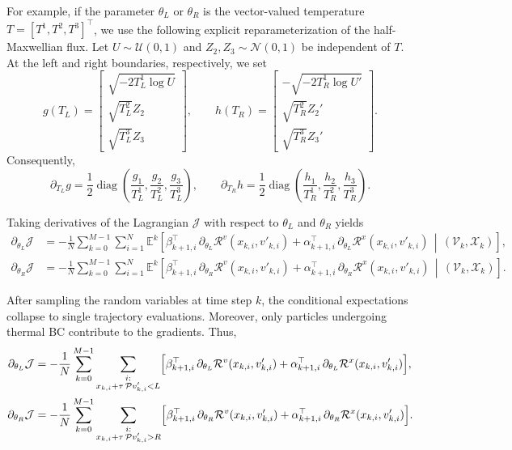 \documentclass[12pt,nopreprintline]{elsarticle}
\begin{document}
{
For example, if the parameter $\theta_L$ or $\theta_R$ is the vector-valued temperature \(T=[T^1,T^2,T^3]^\top\), we use the following explicit reparameterization of the half-Maxwellian flux. Let \(U\sim\mathcal U(0,1)\) and \(Z_2,Z_3\sim\mathcal N(0,1)\) be independent of \(T\). At the left and right boundaries, respectively, we set
\[
g(T_L)=
\begin{bmatrix}
\sqrt{-2T_L^1\log U}\\
\sqrt{T_L^2}Z_2\\
\sqrt{T_L^3}Z_3
\end{bmatrix},
\qquad
h(T_R)=
\begin{bmatrix}
-\sqrt{-2T_R^1\log U'}\\
\sqrt{T_R^2}Z_2'\\
\sqrt{T_R^3}Z_3'
\end{bmatrix}.
\]
Consequently,
\[
\partial_{T_L}g
=
\frac12\operatorname{diag}
\left(\frac{g_1}{T_L^1},\frac{g_2}{T_L^2},\frac{g_3}{T_L^3}\right),
\qquad
\partial_{T_R}h
=
\frac12\operatorname{diag}
\left(\frac{h_1}{T_R^1},\frac{h_2}{T_R^2},\frac{h_3}{T_R^3}\right).
\]

}

Taking derivatives of the Lagrangian $\mathcal J$ with respect to $\theta_L$ and $\theta_R$ yields
\begin{align}
\partial_{\theta_L} \mathcal J
&=
-\frac{1}{N} \sum_{k=0}^{M-1} \sum_{i=1}^N
\mathbb E^k \!\left[
\beta_{k+1,i}^{\top}\,\partial_{\theta_L}\mathcal R^v(x_{k,i},v'_{k,i})
+
\alpha_{k+1,i}^{\top}\,\partial_{\theta_L}\mathcal R^x(x_{k,i},v'_{k,i})
\,\middle|\, (\mathcal V_k,\mathcal X_k)
\right], \label{eq:thermal_grad_L_expect} \\
\partial_{\theta_R} \mathcal J
&=
-\frac{1}{N} \sum_{k=0}^{M-1} \sum_{i=1}^N
\mathbb E^k \!\left[
\beta_{k+1,i}^{\top}\,\partial_{\theta_R}\mathcal R^v(x_{k,i},v'_{k,i})
+
\alpha_{k+1,i}^{\top}\,\partial_{\theta_R}\mathcal R^x(x_{k,i},v'_{k,i})
\,\middle|\, (\mathcal V_k,\mathcal X_k)
\right]. \label{eq:thermal_grad_R_expect}
\end{align}

After sampling the random variables at time step $k$, the conditional expectations collapse to single trajectory evaluations. Moreover, only particles undergoing thermal BC contribute to the gradients. Thus,
\begin{align}
\partial_{\theta_L} \mathcal J
&=
-\frac{1}{N} \sum_{k=0}^{M-1}
\sum_{\substack{i:\\ x_{k,i}+\tau\,\mathcal P v'_{k,i}<L}}
\Bigl[
\beta_{k+1,i}^{\top}\,\partial_{\theta_L}\mathcal R^v(x_{k,i},v'_{k,i})
+
\alpha_{k+1,i}^{\top}\,\partial_{\theta_L}\mathcal R^x(x_{k,i},v'_{k,i})
\Bigr],
\label{eq:thermal_grad_L}\\
\partial_{\theta_R} \mathcal J
&=
-\frac{1}{N} \sum_{k=0}^{M-1}
\sum_{\substack{i:\\ x_{k,i}+\tau\,\mathcal P v'_{k,i}>R}}
\Bigl[
\beta_{k+1,i}^{\top}\,\partial_{\theta_R}\mathcal R^v(x_{k,i},v'_{k,i})
+
\alpha_{k+1,i}^{\top}\,\partial_{\theta_R}\mathcal R^x(x_{k,i},v'_{k,i})
\Bigr].
\label{eq:thermal_grad_R}
\end{align}
\end{document}
